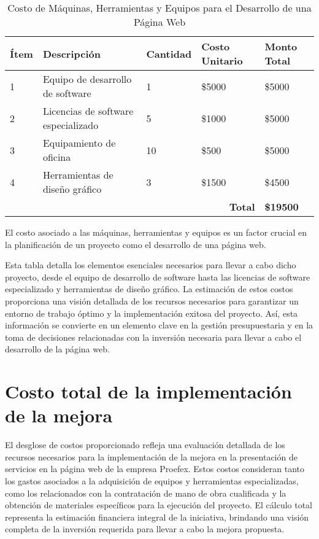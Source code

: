 \begin{table}[!ht]
    \centering
    \begin{tabular}{|p{3cm}|p{4cm}|p{2cm}|p{2cm}|p{2cm}|}
    \hline
    \textbf{Ítem} & \textbf{Descripción} & \textbf{Cantidad} & \textbf{Costo Unitario} & \textbf{Monto Total} \\
    \hline
    1 & Equipo de desarrollo de software & 1 & \$5000 & \$5000 \\
    \hline
    2 & Licencias de software especializado & 5 & \$1000 & \$5000 \\
    \hline
    3 & Equipamiento de oficina & 10 & \$500 & \$5000 \\
    \hline
    4 & Herramientas de diseño gráfico & 3 & \$1500 & \$4500 \\
    \hline
    \multicolumn{4}{|r|}{\textbf{Total}} & \textbf{\$19500} \\
    \hline
    \end{tabular}
    \caption{Costo de Máquinas, Herramientas y Equipos para el Desarrollo de una Página Web}
    \label{tab:costo_maquinas}
\end{table}

El costo asociado a las máquinas, herramientas y equipos es un factor crucial en la planificación de un proyecto como el desarrollo de una página web.

Esta tabla detalla los elementos esenciales necesarios para llevar a cabo dicho proyecto, desde el equipo de desarrollo de software hasta las licencias de software especializado y herramientas de diseño gráfico. La estimación de estos costos proporciona una visión detallada de los recursos necesarios para garantizar un entorno de trabajo óptimo y la implementación exitosa del proyecto. Así, esta información se convierte en un elemento clave en la gestión presupuestaria y en la toma de decisiones relacionadas con la inversión necesaria para llevar a cabo el desarrollo de la página web.

\section{Costo total de la implementación de la mejora}

El desglose de costos proporcionado refleja una evaluación detallada de los recursos necesarios para la implementación de la mejora en la presentación de servicios en la página web de la empresa Proefex. Estos costos consideran tanto los gastos asociados a la adquisición de equipos y herramientas especializadas, como los relacionados con la contratación de mano de obra cualificada y la obtención de materiales específicos para la ejecución del proyecto. El cálculo total representa la estimación financiera integral de la iniciativa, brindando una visión completa de la inversión requerida para llevar a cabo la mejora propuesta.


